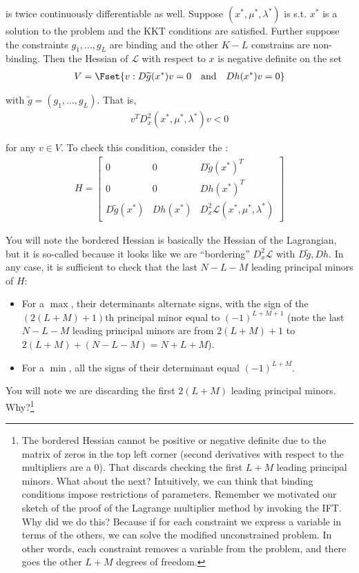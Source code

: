 \documentclass{article}
\begin{document}
is twice continuously differentiable as well. Suppose $(x^*, \mu^*, \lambda^*)$ is s.t. $x^*$ is a solution to the problem and the KKT conditions are satisfied. Further suppose the constraints $g_1, \ldots, g_L$ are binding and the other $K - L$ constrains are non-binding. Then the Hessian of $\mathcal{L}$ with respect to $x$ is negative definite on the set
\begin{align*}
  V = \Fset{v: D \widetilde{g}(x^*) v = 0 \quad\text{and}\quad Dh(x^*) v = 0}
\end{align*}

with $\widetilde{g} = (g_1, \ldots, g_L)$. That is,
\begin{align*}
  v^T D^2_x (x^*, \mu^*, \lambda^*) v < 0
\end{align*}

for any $v \in V$. To check this condition, consider the :
\begin{align*}
  H
  =
  \begin{bmatrix}
    0                    & 0        & D \widetilde{g}(x^*)^T \\
    0                    & 0        & D h(x^*)^T \\
    D \widetilde{g}(x^*) & D h(x^*) & D^2_x \mathcal{L}(x^*, \mu^*, \lambda^*)
  \end{bmatrix}
\end{align*}

You will note the bordered Hessian is basically the Hessian of the Lagrangian, but it is so-called because it looks like we are ``bordering'' $D^2_x \mathcal{L}$ with $D \widetilde{g}, Dh$. In any case, it is sufficient to check that the last $N - L - M$ leading principal minors of $H$:
\begin{itemize}[label=$\bullet$]
  \item For a $\max$, their determinants alternate signs, with the sign of the $(2(L + M) + 1)$th principal minor equal to $(-1)^{L + M + 1}$ (note the last $N - L - M$ leading principal minors are from $2(L + M) + 1$ to $2(L + M) + (N - L - M) = N + L + M$).
  \item For a $\min$, all the signs of their determinant equal $(-1)^{L + M}$.
\end{itemize}

You will note we are discarding the first $2(L + M)$ leading principal minors. Why?\footnote{The bordered Hessian cannot be  positive or negative definite due to the  matrix of  zeros in the top left corner (second derivatives with respect to the multipliers are a $0$). That discards checking the first $L + M$ leading principal minors. What about the next? Intuitively, we can think that binding conditions impose restrictions of parameters. Remember we motivated our sketch of the proof of the Lagrange multiplier method by invoking the IFT. Why did we do this? Because if for each constraint we express a variable in terms  of the others, we can solve the modified unconstrained problem. In other words, each constraint removes a variable from the problem, and there goes the other $L + M$ degrees of freedom.}
\end{document}
